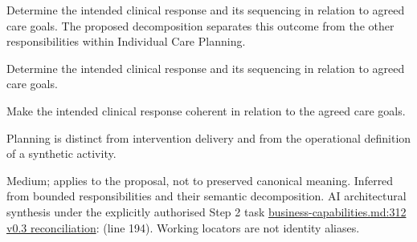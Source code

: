 Determine the intended clinical response and its sequencing in relation to agreed care goals. The proposed decomposition separates this outcome from the other responsibilities within Individual Care Planning.



Determine the intended clinical response and its sequencing in relation to agreed care goals.



Make the intended clinical response coherent in relation to the agreed care goals.



Planning is distinct from intervention delivery and from the operational definition of a synthetic activity.


Medium; applies to the proposal, not to preserved canonical meaning.
Inferred from bounded responsibilities and their semantic decomposition. AI architectural synthesis under the explicitly authorised Step 2 task \hyperref[evidence:a4c0900c47c945d9]{business-capabilities.md:312}
\hyperref[model:reconciliation]{v0.3 reconciliation}: \texttt{} (line 194). Working locators are not identity aliases.
